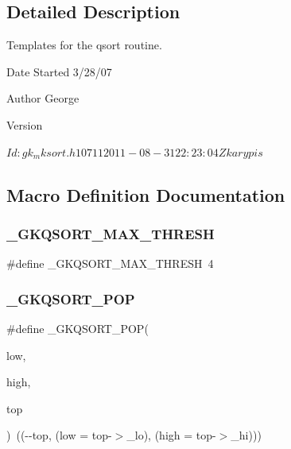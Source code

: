 \subsection{Detailed Description}
Templates for the qsort routine. 

\begin{DoxyDate}{Date}
Started 3/28/07 
\end{DoxyDate}
\begin{DoxyAuthor}{Author}
George 
\end{DoxyAuthor}
\begin{DoxyVersion}{Version}
\begin{DoxyVerb}$Id: gk_mksort.h 10711 2011-08-31 22:23:04Z karypis $ \end{DoxyVerb}
 
\end{DoxyVersion}


\subsection{Macro Definition Documentation}
\mbox{\label{a00071_a43b8aac87db5c2969428fbc7248519ca}} 
\subsubsection{\texorpdfstring{\+\_\+\+G\+K\+Q\+S\+O\+R\+T\+\_\+\+M\+A\+X\+\_\+\+T\+H\+R\+E\+SH}{\_GKQSORT\_MAX\_THRESH}}
{\footnotesize\ttfamily \#define \+\_\+\+G\+K\+Q\+S\+O\+R\+T\+\_\+\+M\+A\+X\+\_\+\+T\+H\+R\+E\+SH~4}

\mbox{\label{a00071_af72e9377f158204172842cd4e01a7d4b}} 
\subsubsection{\texorpdfstring{\+\_\+\+G\+K\+Q\+S\+O\+R\+T\+\_\+\+P\+OP}{\_GKQSORT\_POP}}
{\footnotesize\ttfamily \#define \+\_\+\+G\+K\+Q\+S\+O\+R\+T\+\_\+\+P\+OP(\begin{DoxyParamCaption}\item[{}]{low,  }\item[{}]{high,  }\item[{}]{top }\end{DoxyParamCaption})~((-\/-\/top, (low = top-\/$>$\+\_\+lo), (high = top-\/$>$\+\_\+hi)))}

